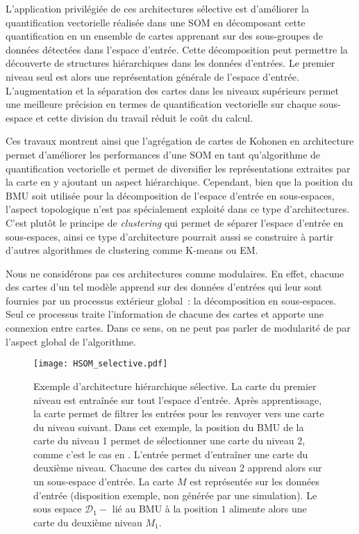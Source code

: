 \documentclass[../main]{subfiles}
\begin{document}
L'application privilégiée de ces architectures sélective est d'améliorer la quantification vectorielle réalisée dans une SOM en décomposant cette quantification en un ensemble de cartes apprenant sur des sous-groupes de données détectées dans l'espace d'entrée.
Cette décomposition peut permettre la découverte de structures hiérarchiques dans les données d'entrées.
Le premier niveau seul est alors une représentation générale de l'espace d'entrée. L'augmentation et la séparation des cartes dans les niveaux supérieurs permet une meilleure précision en termes de quantification vectorielle sur chaque sous-espace et cette division du travail réduit le coût du calcul.

Ces travaux montrent ainsi que l'agrégation de cartes de Kohonen en architecture permet d'améliorer les performances d'une SOM en tant qu'algorithme de quantification vectorielle et permet de diversifier les représentations extraites par la carte en y ajoutant un aspect hiérarchique.
Cependant, bien que la position du BMU soit utilisée pour la décomposition de l'espace d'entrée en sous-espaces, l'aspect topologique n'est pas spécialement exploité dans ce type d'architectures. C'est plutôt le principe de \emph{clustering} qui permet de séparer l'espace d'entrée en sous-espaces, ainsi ce type d'architecture pourrait aussi se construire à partir d'autres algorithmes de clustering comme K-means ou EM.

Nous ne considérons pas ces architectures comme modulaires.
En effet, chacune des cartes d'un tel modèle apprend sur des données d'entrées qui leur sont fournies par un processus extérieur global~: la décomposition en sous-espaces. Seul ce processus traite l'information de chacune des cartes et apporte une connexion entre cartes. Dans ce sens, on ne peut pas parler de modularité de par l'aspect global de l'algorithme. 

\begin{figure}
    \texttt{[image: HSOM\_selective.pdf]}
    \caption{Exemple d'architecture hiérarchique sélective. La carte du premier niveau est entraînée sur tout l'espace d'entrée. Après apprentissage, la carte permet de filtrer les entrées pour les renvoyer vers une carte du niveau suivant. Dans cet exemple, la position du BMU de la carte du niveau 1 permet de sélectionner une carte du niveau 2, comme c'est le cas en \cite{barbalho_hierarchical_2001}. 
    L'entrée permet d'entraîner une carte du deuxième niveau. Chacune des cartes du niveau 2 apprend alors sur un sous-espace d'entrée. La carte $M$ est représentée sur les données d'entrée (disposition exemple, non générée par une simulation). Le sous espace $\mathcal{D}_1-$ lié au BMU à la position $1$ alimente alors une carte du deuxième niveau $M_1$.
    \label{fig:hsom_selective}}
\end{figure}
\end{document}
